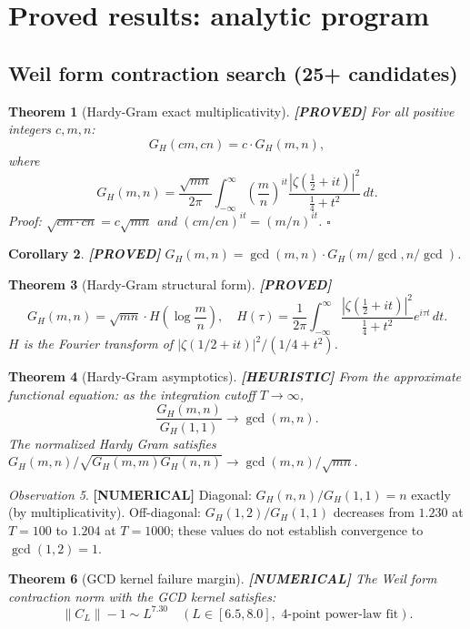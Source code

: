 \documentclass[11pt]{article}
\newtheorem{theorem}{Theorem}[section]
\newtheorem{corollary}[theorem]{Corollary}
\theoremstyle{remark}
\newtheorem{observation}[theorem]{Observation}
\newcommand{\PROVED}{\textbf{\color{blue}[PROVED]}}
\newcommand{\NUMERICAL}{\textbf{\color{orange}[NUMERICAL]}}
\newcommand{\HEURISTIC}{\textbf{\color{orange!80!black}[HEURISTIC]}}
\DeclareRobustCommand{\_}{\ifmmode\text{\textunderscore}\else\textunderscore\allowbreak\fi}
\begin{document}
\section{Proved results: analytic program}

\subsection{Weil form contraction search (25+ candidates)}

\begin{theorem}[Hardy-Gram exact multiplicativity] \PROVED{}
For all positive integers $c, m, n$:
\[
G_H(cm, cn) = c \cdot G_H(m, n),
\]
where
\[
G_H(m,n) = \frac{\sqrt{mn}}{2\pi} \int_{-\infty}^\infty \left(\frac{m}{n}\right)^{it}
\frac{|\zeta(\tfrac{1}{2}+it)|^2}{\tfrac{1}{4}+t^2}\,dt.
\]
Proof: $\sqrt{cm \cdot cn} = c\sqrt{mn}$ and $(cm/cn)^{it} = (m/n)^{it}$. $\square$
\end{theorem}

\begin{corollary} \PROVED{}
$G_H(m,n) = \gcd(m,n) \cdot G_H(m/\gcd, n/\gcd)$.
\end{corollary}

\begin{theorem}[Hardy-Gram structural form] \PROVED{}
\[
G_H(m,n) = \sqrt{mn} \cdot H\!\left(\log\frac{m}{n}\right), \quad
H(\tau) = \frac{1}{2\pi}\int_{-\infty}^\infty \frac{|\zeta(\tfrac{1}{2}+it)|^2}{\tfrac{1}{4}+t^2} e^{i\tau t}\,dt.
\]
$H$ is the Fourier transform of $|\zeta(1/2+it)|^2/(1/4+t^2)$.
\end{theorem}

\begin{theorem}[Hardy-Gram asymptotics] \HEURISTIC{}
From the approximate functional equation: as the integration cutoff $T \to \infty$,
\[
\frac{G_H(m,n)}{G_H(1,1)} \to \gcd(m,n).
\]
The normalized Hardy Gram satisfies $G_H(m,n)/\sqrt{G_H(m,m) G_H(n,n)} \to \gcd(m,n)/\sqrt{mn}$.
\end{theorem}

\begin{observation} \NUMERICAL{}
Diagonal: $G_H(n,n)/G_H(1,1) = n$ exactly (by multiplicativity).
Off-diagonal: $G_H(1,2)/G_H(1,1)$ decreases from $1.230$ at $T=100$ to $1.204$ at $T=1000$;
these values do not establish convergence to $\gcd(1,2) = 1$.
\end{observation}

\begin{theorem}[GCD kernel failure margin] \NUMERICAL{}
The Weil form contraction norm with the GCD kernel satisfies:
\[
\|C_L\| - 1 \sim L^{7.30} \quad (L \in [6.5, 8.0], \text{ 4-point power-law fit}).
\]
\end{theorem}
\end{document}
